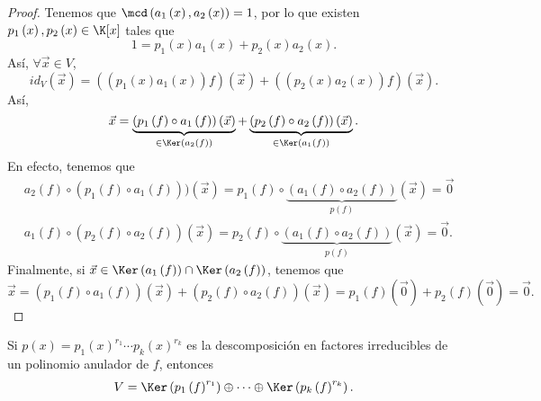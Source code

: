 \begin{proof}
	Tenemos que $\displaystyle \mcd\left(a_{1}\left(x\right), a_{2}\left(x\right)\right) = 1 $, por lo que existen $\displaystyle p_{1}\left(x\right), p_{2}\left(x\right) \in \K[x] $ tales que 
	\[ 1 = p_{1}\left(x\right)a_{1}\left(x\right) + p_{2}\left(x\right)a_{2}\left(x\right) .\]
Así, $\displaystyle \forall \vec{x} \in V $, 
\[id _{V}\left(\vec{x}\right) = \left(\left(p_{1}\left(x\right)a_{1}\left(x\right)\right)f\right)\left(\vec{x}\right) + \left(\left(p_{2}\left(x\right)a_{2}\left(x\right)\right)f\right)\left(\vec{x}\right) .\]
Así,
\[\vec{x} = \underbrace{\left(p_{1}\left(f\right)\circ a_{1}\left(f\right)\right)\left(\vec{x}\right)}_{\in\Ker\left(a_{2}\left(f\right)\right)}+\underbrace{\left(p_{2}\left(f\right)\circ a_{2}\left(f\right)\right)\left(\vec{x}\right)}_{\in\Ker\left(a_{1}\left(f\right)\right)} .\]
En efecto, tenemos que 
\[
\begin{split}
	& a_{2}\left(f\right) \circ \left(p_{1}\left(f\right)\circ a_{1}\left(f\right)\right))\left(\vec{x}\right) = p_{1}\left(f\right)\circ\underbrace{\left(a_{1}\left(f\right)\circ a_{2}\left(f\right)\right)}_{p\left(f\right)}\left(\vec{x}\right) = \vec{0} \\
	& a_{1}\left(f\right) \circ \left(p_{2}\left(f\right)\circ a_{2}\left(f\right)\right)\left(\vec{x}\right) = p_{2}\left(f\right) \circ \underbrace{\left(a_{1}\left(f\right)\circ a_{2}\left(f\right)\right)}_{p\left(f\right)}\left(\vec{x}\right) = \vec{0}.
\end{split}
\]
Finalmente, si $\displaystyle \vec{x}\in \Ker\left(a_{1}\left(f\right)\right)\cap\Ker\left(a_{2}\left(f\right)\right) $, tenemos que 
\[\vec{x} = \left(p_{1}\left(f\right) \circ a_{1}\left(f\right)\right)\left(\vec{x}\right) + \left(p_{2}\left(f\right)\circ a_{2}\left(f\right)\right)\left(\vec{x}\right) = p_{1}\left(f\right)\left(\vec{0}\right) + p_{2}\left(f\right)\left(\vec{0}\right) = \vec{0} .\]
\end{proof}
\begin{fprop}[]
\normalfont Si $\displaystyle p\left(x\right) = p_{1}\left(x\right)^{r_{1}}\cdots p_{k}\left(x\right)^{r_{k}} $ es la descomposición en factores irreducibles de un polinomio anulador de $\displaystyle f $, entonces
\[V = \Ker\left(p_{1}\left(f\right)^{r_{1}}\right) \oplus \cdots \oplus \Ker\left(p_{k}\left(f\right)^{r_{k}}\right) .\]
\end{fprop}
